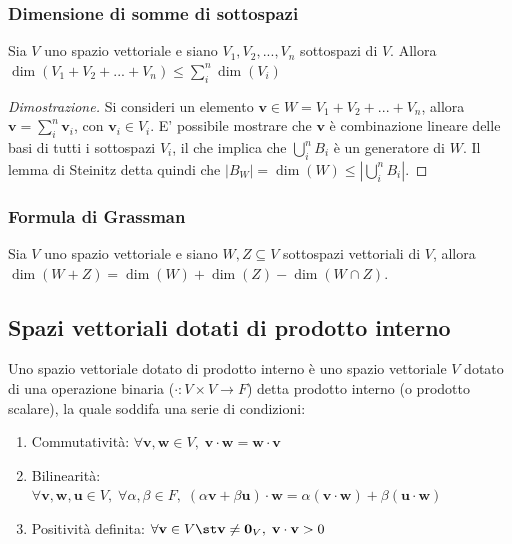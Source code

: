     \vspace{10pt}
    \subsubsection{Dimensione di somme di sottospazi} \label{subsubsec:vsdimention}
    \begin{proposition}
        Sia $V$ uno spazio vettoriale e siano $V_1, V_2, ..., V_n$ sottospazi di $V$. Allora $\dim(V_1 + V_2 + ... + V_n) \leq \displaystyle \sum_{i}^{n} \dim(V_i)$
    \end{proposition}

    \begin{proof}[Dimostrazione]
        Si consideri un elemento $\mathbf{v} \in W = V_1 + V_2 + ... + V_n$, allora $\mathbf{v} = \displaystyle \sum_{i}^{n} \mathbf{v}_{i}$, con $\mathbf{v}_{i} \in V_i$.
        E' possibile mostrare che $\mathbf{v}$ è combinazione lineare delle basi di tutti i sottospazi $V_i$, il che implica che $\displaystyle \bigcup_{i}^{n} B_i$ è un generatore di $W$. Il lemma di Steinitz detta quindi che $|B_W| = \dim(W) \leq |\displaystyle \bigcup_{i}^{n} B_i|$.
    \end{proof}

    \vspace{10pt}
    \subsubsection{Formula di Grassman} \label{subsubsec:vsgrassman}
    Sia $V$ uno spazio vettoriale e siano $W, Z \subseteq V$ sottospazi vettoriali di $V$, allora $\dim(W + Z) = \dim(W) + \dim(Z) - \dim(W \cap Z)$.



\vspace{10pt}
\subsection{Spazi vettoriali dotati di prodotto interno} \label{subsec:vsdotted}
    Uno spazio vettoriale dotato di prodotto interno è uno spazio vettoriale $V$ dotato di una operazione binaria ($\cdot : V \times V \rightarrow F$) detta prodotto interno (o prodotto scalare), la quale soddifa una serie di condizioni:
    \begin{enumerate}[label=(\arabic*)]
        \item Commutatività: $\forall \mathbf{v}, \mathbf{w} \in V, \; \mathbf{v} \cdot \mathbf{w} = \mathbf{w} \cdot \mathbf{v}$
        \item Bilinearità: $\forall \mathbf{v}, \mathbf{w}, \mathbf{u} \in V, \; \forall \alpha, \beta \in F, \; (\alpha \mathbf{v} + \beta \mathbf{u}) \cdot \mathbf{w} = \alpha (\mathbf{v} \cdot \mathbf{w}) + \beta (\mathbf{u} \cdot \mathbf{w})$
        \item Positività definita: $\forall \mathbf{v} \in V \st \mathbf{v} \neq \mathbf{0}_V, \; \mathbf{v} \cdot \mathbf{v} > 0$
    \end{enumerate}

